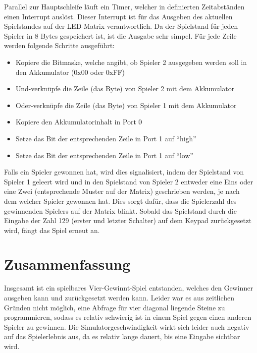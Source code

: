 Parallel zur Hauptschleife läuft ein Timer, welcher in definierten Zeitabständen einen Interrupt auslöst.
Dieser Interrupt ist für das Ausgeben des aktuellen Spielstandes auf der LED-Matrix verantwortlich. 
Da der Spielstand für jeden Spieler in 8 Bytes gespeichert ist, ist die Ausgabe sehr simpel. Für jede Zeile werden folgende Schritte ausgeführt:
\begin{itemize}
	\item Kopiere die Bitmaske, welche angibt, ob Spieler 2 ausgegeben werden soll in den Akkumulator (0x00 oder 0xFF)
	\item Und-verknüpfe die Zeile (das Byte) von Spieler 2 mit dem Akkumulator
	\item Oder-verknüpfe die Zeile (das Byte) von Spieler 1 mit dem Akkumulator
	\item Kopiere den Akkumulatorinhalt in Port 0
	\item Setze das Bit der entsprechenden Zeile in Port 1 auf \enquote{high}
	\item Setze das Bit der entsprechenden Zeile in Port 1 auf \enquote{low}
\end{itemize}

Falls ein Spieler gewonnen hat, wird dies signalisiert, indem der Spielstand von Spieler 1 geleert wird und in den Spielstand von Spieler 2 entweder eine Eins oder eine Zwei (entsprechende Muster auf der Matrix) geschrieben werden, je nach dem welcher Spieler gewonnen hat.
Dies sorgt dafür, dass die Spielerzahl des gewinnenden Spielers auf der Matrix blinkt.
Sobald das Spielstand durch die Eingabe der Zahl 129 (erster und letzter Schalter) auf dem Keypad zurückgesetzt wird, fängt das Spiel erneut an.


\FloatBarrier
\chapter{Zusammenfassung}

Insgesamt ist ein spielbares Vier-Gewinnt-Spiel entstanden, welches den Gewinner ausgeben kann und zurückgesetzt werden kann.
Leider war es aus zeitlichen Gründen nicht möglich, eine Abfrage für vier diagonal liegende Steine zu programmieren, sodass es relativ schwierig ist in einem Spiel gegen einen anderen Spieler zu gewinnen.
Die Simulatorgeschwindigkeit wirkt sich leider auch negativ auf das Spielerlebnis aus, da es relativ lange dauert, bis eine Eingabe sichtbar wird. 


